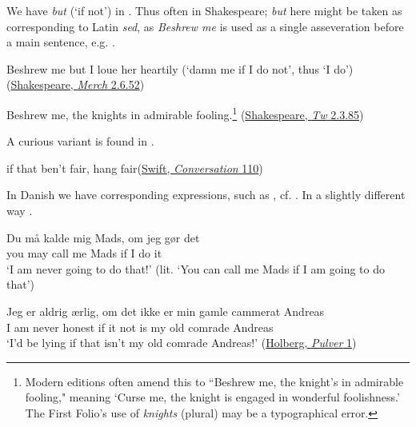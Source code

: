 We have \textit{but} (`if not') in . Thus often in Shakespeare; \textit{but} here might be taken as corresponding to Latin \textit{sed}, as \textit{Beshrew me} is used as a single asseveration before a main sentence, e.g. .

\ea \label{ex:04-74}
Beshrew me but I loue her heartily \phantom{x} (`damn me if I do not', thus `I do')\\\hfill(\href{https://internetshakespeare.uvic.ca/doc/MV_F1/scene/2.6/index.html#tln-950}{Shakespeare, \textit{Merch} 2.6.52})
\z

\ea \label{ex:04-75}
Beshrew me, the knights in admirable fooling.\footnote{Modern editions often amend this to ``Beshrew me, the knight's in admirable fooling," meaning `Curse me, the knight is engaged in wonderful foolishness.' The First Folio's use of \textit{knights} (plural) may be a typographical error. \eds}
\hfill(\href{https://internetshakespeare.uvic.ca/doc/TN_F1/scene/2.3/index.html#tln-775}{Shakespeare, \textit{Tw} 2.3.85}) %
\z

A curious variant is found in .

\ea \label{ex:04-76}
if that ben't fair, hang fair\hfill(\href{https://archive.org/details/cu31924013200898/page/n145/mode/2up?q=\%22hang+fair\%22&view=theater}{Swift, \textit{Conversation} 110})
\z

In Danish we have corresponding expressions, such as , cf. . In a slightly different way .

\ea \label{ex:04-77}
\gll Du må kalde mig Mads, om jeg gør det\\
 you may call me Mads if I do it\\
\glt `I am never going to do that!' (lit. `You can call me Mads if I am going to do that')
\z

\ea \label{ex:04-78}
\ea{}
\gll Jeg er aldrig ærlig, om det ikke er min gamle cammerat Andreas\\
 I am never honest if it not is my old comrade Andreas\\
\glt `I'd be lying if that isn't my old comrade Andreas!'
\hfill(\href{https://tekster.kb.dk/text/adl-texts-holb04val-shoot-workid68476}{Holberg, \textit{Pulver} 1})

